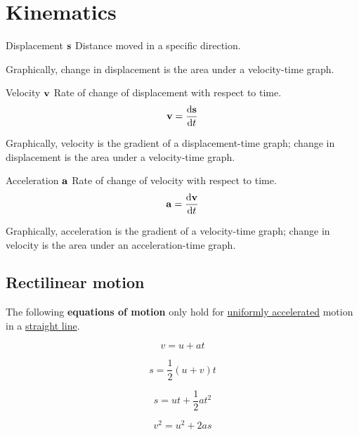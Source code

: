 \section{Kinematics}

\begin{defn}{Displacement $\vb{s}$}{}
Distance moved in a specific direction. 
\end{defn} 
Graphically, change in displacement is the area under a velocity-time graph.

\begin{defn}{Velocity $\vb{v}$}{}
Rate of change of displacement with respect to time. 
\begin{equation} 
\vb{v}=\dv{\vb{s}}{t} 
\end{equation}
\end{defn} 
Graphically, velocity is the gradient of a displacement-time graph; change in displacement is the area under a velocity-time graph.

\begin{defn}{Acceleration $\vb{a}$}{}
Rate of change of velocity with respect to time. 
\begin{equation}
\vb{a}=\dv{\vb{v}}{t}
\end{equation}
\end{defn} 
Graphically, acceleration is the gradient of a velocity-time graph; change in velocity is the area under an acceleration-time graph.

\subsection{Rectilinear motion}
The following \textbf{equations of motion} only hold for \underline{uniformly accelerated} motion in a \underline{straight line}.

\begin{equation}\label{eqn_mtn1} v=u+at \end{equation}

\begin{equation}\label{eqn_mtn2} s=\frac{1}{2}(u+v)t \end{equation}

\begin{equation}\label{eqn_mtn3} s=ut+\frac{1}{2}at^2 \end{equation}

\begin{equation}\label{eqn_mtn4} v^2=u^2+2as \end{equation}


